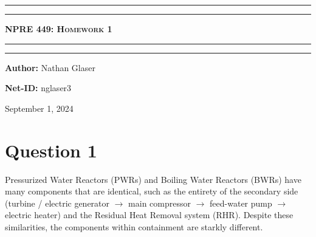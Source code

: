 \documentclass{article}
\begin{document}
\begin{titlepage}

\centering
\scshape
\vspace{\baselineskip}

%
\rule{\textwidth}{1.6pt}\vspace*{-\baselineskip}\vspace*{2pt}
\rule{\textwidth}{0.4pt}

{\Huge \textbf{\textsc{NPRE 449: Homework 1 \\
\vspace{15pt}}}}

\rule{\textwidth}{0.4pt}\vspace*{-\baselineskip}\vspace{3.2pt}
\rule{\textwidth}{1.6pt}\vspace{6pt}
\vspace{1.5\baselineskip}


\large \centerline{\textbf{Author:} Nathan Glaser}
\large \centerline{\textbf{Net-ID:} nglaser3}
\quad

\vfill
\large \centerline{September 1, 2024}
%
\end{titlepage}

\tableofcontents
\newpage
{}


\section{Question 1}
Pressurized Water Reactors (PWRs) and Boiling Water Reactors (BWRs) have many components that are identical, such as the entirety of the secondary side (turbine / electric generator  $\rightarrow$ main compressor $\rightarrow$ feed-water pump $\rightarrow$ electric heater) and the Residual Heat Removal system (RHR). Despite these similarities, the components within containment are starkly different. 
\end{document}
